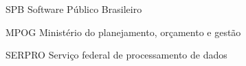 \begin{siglas}
  \item[SPB] Software Público Brasileiro
  \item[MPOG] Ministério do planejamento, orçamento e gestão
  \item[SERPRO] Serviço federal de processamento de dados
\end{siglas}
